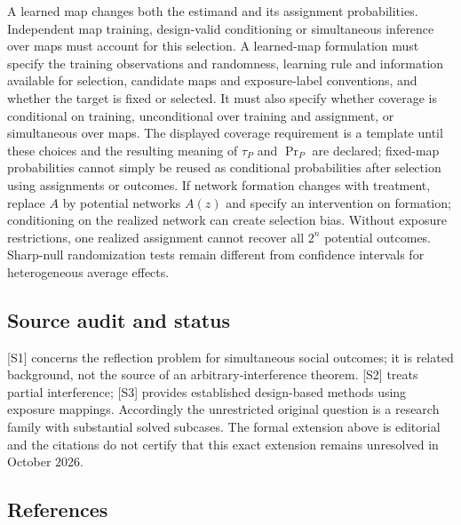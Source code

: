 \documentclass[11pt,a4paper]{article}
\begin{document}
A learned map changes both the estimand and its assignment probabilities. Independent map training, design-valid conditioning or simultaneous inference over maps must account for this selection. A learned-map formulation must specify the training observations and randomness, learning rule and information available for selection, candidate maps and exposure-label conventions, and whether the target is fixed or selected. It must also specify whether coverage is conditional on training, unconditional over training and assignment, or simultaneous over maps. The displayed coverage requirement is a template until these choices and the resulting meaning of $\tau_P$ and $\Pr_P$ are declared; fixed-map probabilities cannot simply be reused as conditional probabilities after selection using assignments or outcomes. If network formation changes with treatment, replace $A$ by potential networks $A(z)$ and specify an intervention on formation; conditioning on the realized network can create selection bias. Without exposure restrictions, one realized assignment cannot recover all $2^n$ potential outcomes. Sharp-null randomization tests remain different from confidence intervals for heterogeneous average effects.

\subsection*{Source audit and status}

[S1] concerns the reflection problem for simultaneous social outcomes; it is related background, not the source of an arbitrary-interference theorem. [S2] treats partial interference; [S3] provides established design-based methods using exposure mappings. Accordingly the unrestricted original question is a research family with substantial solved subcases. The formal extension above is editorial and the citations do not certify that this exact extension remains unresolved in October 2026.

\subsection*{References}
\end{document}
